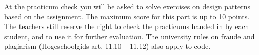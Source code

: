 At the practicum check you will be asked to solve exercises on design patterns based on the assignment. The maximum score for this part is up to 10 points.
The teachers still reserve the right to check the practicums handed in by each student, and to use it for further evaluation. The university rules on fraude and plagiarism (Hogeschoolgids art. 11.10 -- 11.12) also apply to code.
